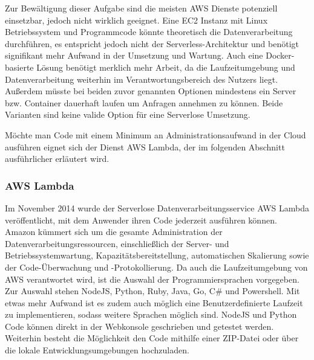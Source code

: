 {Zur Bewältigung dieser Aufgabe sind die meisten AWS Dienste potenziell einsetzbar, jedoch nicht wirklich geeignet.
Eine EC2 Instanz mit Linux Betriebssystem und Programmcode könnte theoretisch die Datenverarbeitung durchführen, es entspricht jedoch nicht der Serverless-Architektur und benötigt signifikant mehr Aufwand in der Umsetzung und Wartung.
Auch eine Docker-basierte Lösung benötigt merklich mehr Arbeit, da die Laufzeitumgebung und Datenverarbeitung weiterhin im Verantwortungsbereich des Nutzers liegt.
Außerdem müsste bei beiden zuvor genannten Optionen mindestens ein Server bzw. Container dauerhaft laufen um Anfragen annehmen zu können.
Beide Varianten sind keine valide Option für eine Serverlose Umsetzung.

Möchte man Code mit einem Minimum an Administrationsaufwand in der Cloud ausführen eignet sich der Dienst AWS Lambda, der im folgenden Abschnitt ausführlicher erläutert wird.

\subsubsection{AWS Lambda}
\label{Lambda}
Im November 2014 wurde der Serverlose Datenverarbeitungsservice AWS Lambda veröffentlicht, mit dem Anwender ihren Code jederzeit ausführen können.
Amazon kümmert sich um die \glqq gesamte Administration der Datenverarbeitungsressourcen, einschließlich der Server- und Betriebssystemwartung, Kapazitätsbereitstellung, automatischen Skalierung sowie der Code-Überwachung und -Protokollierung.\grqq{} \cite{LambdaZitat}
\clearpage
Da auch die Laufzeitumgebung von AWS verantwortet wird, ist die Auswahl der Programmiersprachen vorgegeben.
Zur Auswahl stehen NodeJS, Python, Ruby, Java, Go, C\# und Powershell.
Mit etwas mehr Aufwand ist es zudem auch möglich eine Benutzerdefinierte Laufzeit zu implementieren, sodass weitere Sprachen möglich sind.
NodeJS und Python Code können direkt in der Webkonsole geschrieben und getestet werden.
Weiterhin besteht die Möglichkeit den Code mithilfe einer ZIP-Datei oder über die lokale Entwicklungsumgebungen hochzuladen.\cite{LambdaFAQ}

}
